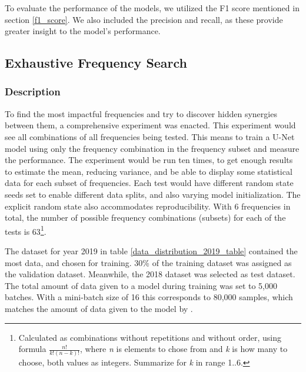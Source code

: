         To evaluate the performance of the models, we utilized the F1 score mentioned in section \ref{f1_score}. We also included the precision and recall, as these provide greater insight to the model's performance.
        
    
    \subsection{Exhaustive Frequency Search}
        \subsubsection{Description}
        To find the most impactful frequencies and try to discover hidden synergies between them, a comprehensive experiment was enacted. This experiment would see all combinations of all frequencies being tested. This means to train a U-Net model using only the frequency combination in the frequency subset and measure the performance. The experiment would be run ten times, to get enough results to estimate the mean,  reducing variance, and be able to display some statistical data for each subset of frequencies. Each test would have different random state seeds set to enable different data splits, and also  varying model initialization. The explicit random state also accommodates reproducibility. With 6 frequencies in total, the number of possible frequency combinations (subsets) for each of the tests is 63\footnote{Calculated as combinations without repetitions and without order, using formula $\frac{n!}{k!(n-k)!}$, where \textit{n} is elements to chose from and \textit{k} is how many to choose, both values as integers. Summarize for \textit{k} in range 1..6.}.
        
        The dataset for year 2019 in table \ref{data_distribution_2019_table} contained the most data, and chosen for training. 30\% of the training dataset was assigned as the validation dataset. Meanwhile, the 2018 dataset was selected as test dataset. The total amount of data given to a model during training was set to 5,000 batches. With a mini-batch size of 16 this corresponds to 80,000 samples, which matches the amount of data given to the model by \citeauthor{brautaset2020acoustic}\cite{brautaset2020acoustic}.
        
